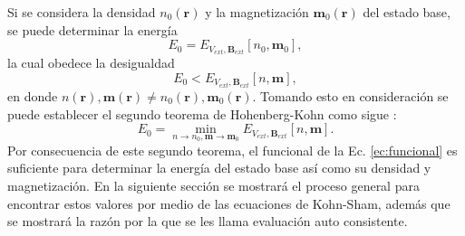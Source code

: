   Si se considera  la densidad $n_0 (\pmb{r})$ y la magnetizaci\'on $\pmb{m}_0  (\pmb{r})$ del estado base, se puede determinar la energ\'ia
  \begin{equation}
  E_0= E_{V_{ext}, \pmb{B}_{ext}}[n_0,\pmb{m}_0], \label{ec:estadoBase}
  \end{equation}
  la cual obedece la desigualdad
  \begin{equation}
  E_0 < E_{V_{ext}, \pmb{B}_{ext}}[n,\pmb{m}], \label{ec:desig}
  \end{equation}
  en donde $ n (\pmb{r}),\pmb{m} (\pmb{r}) \not = n_0 (\pmb{r}),\pmb{m}_0 (\pmb{r})$. Tomando esto en consideraci\'on  se puede establecer el segundo  teorema de Hohenberg-Kohn como sigue \cite{MB-2015}:
  \begin{equation}
  E_0 = \min_{n  \to n_0, \pmb{m} \to \pmb{m}_0} E_{V_{ext}, \pmb{B}_{ext}}[n,\pmb{m}]  \label{ec:HKII}.
  \end{equation}
  Por consecuencia de este segundo teorema, el funcional de la Ec. \ref{ec:funcional} es suficiente para determinar la energ\'ia del estado base as\'i como su densidad y magnetizaci\'on. En la siguiente secci\'on se mostrar\'a el proceso general para encontrar estos valores por medio de las ecuaciones de Kohn-Sham, adem\'as que se mostrar\'a la raz\'on por la que se les llama evaluaci\'on auto consistente.
  
